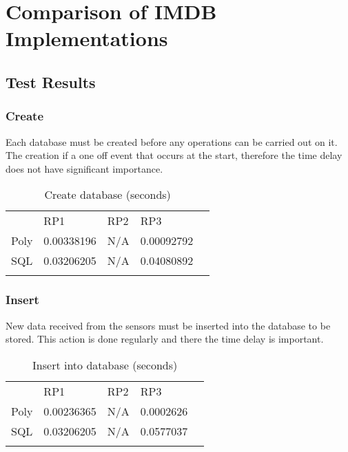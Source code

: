 \chapter{Comparison of IMDB Implementations}
\pagestyle{aidan}

\section{Test Results}
\subsection{Create}
Each database must be created before any operations can be carried out on it. The creation if a one off event that occurs at the start, therefore the time delay does not have significant importance.  

\begin{table}[!htb]
\centering

\label{Create}
\begin{tabular}{lllll}
     & RP1        & RP2 & RP3 &  \\
Poly & 0.00338196 & N/A    & 0.00092792    &  \\
SQL  & 0.03206205 & N/A    & 0.04080892    &  \\
     &             &     &     & 
\end{tabular}
\caption{Create database (seconds) }
\end{table}

\subsection{Insert}
New data received from the sensors must be inserted into the database to be stored. This action is done regularly and there the time delay is important. 
\begin{table}[!htb]
\centering

\label{insert}
\begin{tabular}{lllll}
     & RP1         & RP2 & RP3 &  \\
Poly & 0.00236365 & N/A    & 0.0002626    &  \\
SQL  & 0.03206205 & N/A    & 0.0577037    &  \\
     &             &     &     & 
\end{tabular}
\caption{Insert into database (seconds)}
\end{table}

